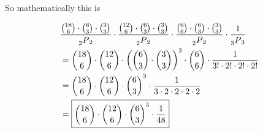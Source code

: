 \documentclass[../Main.tex]{subfiles}
\begin{document}
\begin{alphabet}
{        So mathematically this is

        \begin{align*}
            & \frac{{18 \choose 6} \cdot {6 \choose 3} \cdot {3 \choose 3}}{\prescript{}{2}{P}_2} \cdot \frac{{12 \choose 6} \cdot {6 \choose 3} \cdot {3 \choose 3}}{\prescript{}{2}{P}_2} \cdot \frac{{6 \choose 6} \cdot {6 \choose 3} \cdot {3 \choose 3}}{\prescript{}{2}{P}_2} \cdot \frac{1}{\prescript{}{3}{P}_3} \\
            &= {18 \choose 6} \cdot {12 \choose 6} \cdot \left({6 \choose 3} \cdot {3 \choose 3}\right)^3 \cdot {6 \choose 6} \cdot \frac{1}{3! \cdot 2! \cdot 2! \cdot 2!} \\
            &= {18 \choose 6} \cdot {12 \choose 6} \cdot {6 \choose 3}^3 \cdot \frac{1}{3 \cdot 2 \cdot 2 \cdot 2 \cdot 2} \\
            &= \boxed{{18 \choose 6} \cdot {12 \choose 6} \cdot {6 \choose 3}^3 \cdot \frac{1}{48}} \\
        \end{align*}
    }

\end{alphabet}

\end{document}
